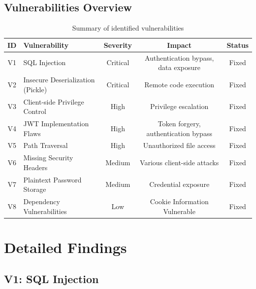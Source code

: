 \documentclass[11pt,a4paper]{article}
\begin{document}
\subsection{Vulnerabilities Overview}

\begin{table}[h]
\centering
\begin{tabular}{clccc}
\toprule
\textbf{ID} & \textbf{Vulnerability} & \textbf{Severity} & \textbf{Impact} & \textbf{Status} \\
\midrule
V1 & SQL Injection & \textcolor{criticalcolor}{Critical} & Authentication bypass, data exposure & \textcolor{fixedcolor}{Fixed} \\
V2 & Insecure Deserialization (Pickle) & \textcolor{criticalcolor}{Critical} & Remote code execution & \textcolor{fixedcolor}{Fixed} \\
V3 & Client-side Privilege Control & \textcolor{highcolor}{High} & Privilege escalation & \textcolor{fixedcolor}{Fixed} \\
V4 & JWT Implementation Flaws & \textcolor{highcolor}{High} & Token forgery, authentication bypass & \textcolor{fixedcolor}{Fixed} \\
V5 & Path Traversal & \textcolor{highcolor}{High} & Unauthorized file access & \textcolor{fixedcolor}{Fixed} \\
V6 & Missing Security Headers & \textcolor{mediumcolor}{Medium} & Various client-side attacks & \textcolor{fixedcolor}{Fixed} \\
V7 & Plaintext Password Storage & \textcolor{mediumcolor}{Medium} & Credential exposure & \textcolor{fixedcolor}{Fixed} \\
V8 & Dependency Vulnerabilities & \textcolor{codeboring}{Low} & Cookie Information Vulnerable & \textcolor{fixedcolor}{Fixed} \\
\bottomrule
\end{tabular}
\caption{Summary of identified vulnerabilities}
\label{tab:vuln_summary}
\end{table}

\section{Detailed Findings}

\subsection{V1: SQL Injection}
\end{document}
